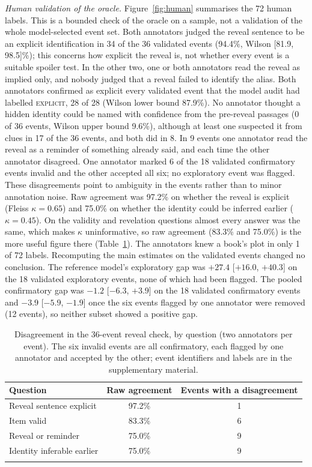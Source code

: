 \documentclass[sn-mathphys]{sn-jnl}%
\theoremstyle{thmstyleone}%
\theoremstyle{thmstyletwo}%
\theoremstyle{thmstylethree}%
\begin{document}
\emph{Human validation of the oracle.} Figure~\ref{fig:human} summarises the 72 human labels. This is a bounded check of the oracle on a sample, not a validation of the whole model-selected event set. Both annotators judged the reveal sentence to be an explicit identification in 34 of the 36 validated events (94.4\%, Wilson [81.9, 98.5]\%); this concerns how explicit the reveal is, not whether every event is a suitable spoiler test. In the other two, one or both annotators read the reveal as implied only, and nobody judged that a reveal failed to identify the alias. Both annotators confirmed as explicit every validated event that the model audit had labelled \textsc{explicit}, 28 of 28 (Wilson lower bound 87.9\%). No annotator thought a hidden identity could be named with confidence from the pre-reveal passages (0 of 36 events, Wilson upper bound 9.6\%), although at least one suspected it from clues in 17 of the 36 events, and both did in 8. In 9 events one annotator read the reveal as a reminder of something already said, and each time the other annotator disagreed. One annotator marked 6 of the 18 validated confirmatory events invalid and the other accepted all six; no exploratory event was flagged. These disagreements point to ambiguity in the events rather than to minor annotation noise. Raw agreement was 97.2\% on whether the reveal is explicit (Fleiss $\kappa=0.65$) and 75.0\% on whether the identity could be inferred earlier ($\kappa=0.45$). On the validity and revelation questions almost every answer was the same, which makes $\kappa$ uninformative, so raw agreement (83.3\% and 75.0\%) is the more useful figure there (Table~\ref{tab:reveal_disagree}). The annotators knew a book's plot in only 1 of 72 labels. Recomputing the main estimates on the validated events changed no conclusion. The reference model's exploratory gap was $+27.4$ [$+16.0$, $+40.3$] on the 18 validated exploratory events, none of which had been flagged. The pooled confirmatory gap was $-1.2$ [$-6.3$, $+3.9$] on the 18 validated confirmatory events and $-3.9$ [$-5.9$, $-1.9$] once the six events flagged by one annotator were removed (12 events), so neither subset showed a positive gap.

\begin{table}[!t]
\caption{Disagreement in the 36-event reveal check, by question (two annotators per event). The six invalid events are all confirmatory, each flagged by one annotator and accepted by the other; event identifiers and labels are in the supplementary material.}\label{tab:reveal_disagree}
\footnotesize
\begin{tabular*}{\textwidth}{@{\extracolsep\fill}p{6.0cm}cc}
\toprule
Question & Raw agreement & Events with a disagreement \\
\midrule
Reveal sentence explicit & 97.2\% & 1 \\
Item valid & 83.3\% & 6 \\
Reveal or reminder & 75.0\% & 9 \\
Identity inferable earlier & 75.0\% & 9 \\
\botrule
\end{tabular*}
\end{table}
\end{document}
